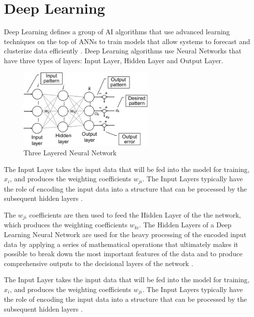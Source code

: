 \documentclass[openright]{normas-utf-tex} %
\begin{document}
\section{Deep Learning}

Deep Learning defines a group of AI algorithms that use advanced learning techniques on the 
top of ANNs to train models that allow systems to forecast and clusterize data 
efficiently \cite{IBMDeepLearning}.
Deep Learning algorithms use Neural Networks that have three types of layers:
Input Layer, Hidden Layer and Output Layer.
        
\begin{figure}[H]
	\centering
	\includegraphics[width=0.6\textwidth]{./images/three-layered-ann.jpg}
	\caption[Three Layered Neural Network]{Three Layered Neural Network}
	\label{fig:threeLayeredAnn}
\end{figure}

The Input Layer takes the input data that will be fed into the model for training,
$x_i$, and produces the weighting coefficients $w_{ji}$. The Input Layers
typically have the role of encoding the input data into a structure that can be processed by the 
subsequent hidden layers \cite{Paranjape2020}.

The $w_{ji}$ coefficients are then used to feed the Hidden Layer of the the network,
which produces the weighting coefficients $w_{ki}$. The Hidden Layers of a Deep Learning 
Neural Network are used for the heavy processing of the encoded input data by applying a series of 
mathematical operations that ultimately makes it possible to break down the most important features
of the data and to produce comprehensive outputs to the decisional layers of the network
\cite{DeepAI_HiddenLayer}.

The Input Layer takes the input data that will be fed into the model for training,
$x_i$, and produces the weighting coefficients $w_{ji}$. The Input Layers
typically have the role of encoding the input data into a structure that can be processed by the 
subsequent hidden layers \cite{Paranjape2020}.
\end{document}
